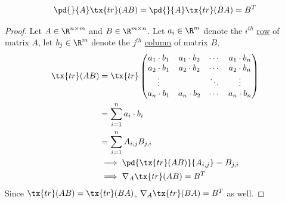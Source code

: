 \documentclass[11pt]{article}
\begin{document}
	\begin{lemma}
		\begin{align}
			\pd{}{A} \tx{tr}(AB) = \pd{}{A} \tx{tr}(BA) = B^T
		\end{align}
		\begin{proof}
			Let $A \in \R^{n \times m}$ and $B \in \R^{m \times n}$. Let $a_i \in \R^m$ denote the $i^{th}$ \ul{row} of matrix $A$, let $b_j \in \R^m$ denote the $j^{th}$ \ul{column} of matrix $B$,
			\begin{align}
				\tx{tr}(AB) &= \tx{tr}
				\begin{pmatrix}
					a_1 \cdot b_1 & a_1 \cdot b_2 & \cdots & a_1 \cdot b_n \\
					a_2 \cdot b_1 & a_2 \cdot b_2 & \cdots & a_2 \cdot b_n \\
					\vdots & & \ddots & \vdots \\
					a_n \cdot b_1 & a_n \cdot b_2 & \cdots & a_n \cdot b_n 
				\end{pmatrix} \\
				&= \sum_{i=1}^n a_i \cdot b_i \\
				&= \sum_{i=1}^n A_{i, j} B_{j, i} \\
				&\implies \pd{\tx{tr}(AB)}{A_{i,j}} = B_{j,i} \\
				&\implies \nabla_A \tx{tr}(AB) = B^T
			\end{align}
			Since $\tx{tr}(AB) = \tx{tr}(BA)$, $\nabla_A \tx{tr}(BA) = B^T$ as well.
		\end{proof}
	\end{lemma}
	
\end{document}

